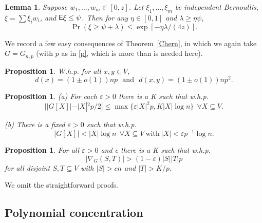 \documentclass[letterpaper,11pt]{article}
\newtheorem{lemma}[thm]{Lemma}
\newtheorem{prop}[thm]{Proposition}
\newcommand{\beq}[1]{\begin{equation}\label{#1}}
\newcommand{\enq}[0]{\end{equation}}
\newcommand{\mn}[0]{\medskip\noindent}
\newcommand{\nin}[0]{\noindent}
\newcommand{\sub}[0]{\subseteq}
\renewcommand{\dots}[0]{,\ldots,}
\newcommand{\0}[0]{\emptyset}
\newcommand{\gl}[0]{\lambda }
\newcommand{\eps}[0]{\varepsilon }
\begin{document}
\begin{lemma}\label{Chernwts}
Suppose $w_1\dots w_m \in [0,z]$.
Let $\xi_1\dots \xi_m$ be independent Bernoullis,
$\xi = \sum \xi_i w_i$, and ${\sf E}\xi \leq\psi$.
Then for any $\eta \in [0,1]$ and $\gl\geq \eta \psi$,
\[\Pr(\xi \geq \psi+\gl) \leq \exp [- \eta\gl/(4z)].\]
\end{lemma}
\nin






\medskip
We
record a few easy consequences of
Theorem~\ref{Chern},
in which we again take $G=G_{n,p}$
(with $p$ as in \eqref{p}, which is more than is needed here).









\begin{prop}\label{vdegree}
W.h.p. for all $x,y\in V$,
\beq{Deg}
d(x)=(1\pm o(1))np ~~~\mbox{and}
~~~d(x,y)=(1\pm o(1))np^2.
\enq
\end{prop}

\begin{prop}\label{propG[X]}
{\rm (a)}
For each $\eps>0$ there is a K such that w.h.p.
\[
||G[X]|-|X|^2p/2| \leq \max\{\eps |X|^2p,K|X|\log n\}
~~\forall X\sub V.
\]

\mn
{\rm (b)}  There is a fixed $\eps>0$ such that w.h.p.
\[
|G[X]| <|X|\log n ~~\forall X\sub V ~\mbox{with}~
|X| < \eps p^{-1}\log n.
\]
\end{prop}









\begin{prop}\label{nablaST}
For all $\eps >0$ and c there is a K such that
w.h.p.
\[
|\nabla_G(S,T)| > (1-\eps)|S||T|p
\]
for all disjoint $S,T\sub V$
with $|S|>cn$ and $|T|>K/p$.
\end{prop}

\nin
We omit the straightforward proofs.




\subsection{Polynomial concentration}\label{SKV}
\end{document}
